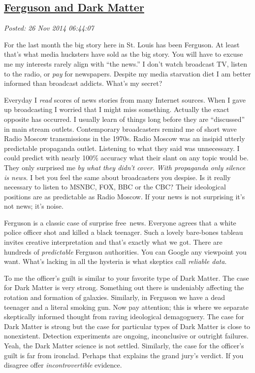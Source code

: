 %

\subsection*{\href{http://bakerjd99.wordpress.com/2014/11/26/ferguson-and-dark-matter/}{Ferguson and Dark Matter}}


\noindent\emph{Posted: 26 Nov 2014 06:44:07}
\vspace{6pt}

For the last month the big story here in St. Louis has been Ferguson. At
least that's what media hucksters have sold as the big story. You will
have to excuse me my interests rarely align with ``the news.'' I don't
watch broadcast TV, listen to the radio, or \emph{pay} for newspapers.
Despite my media starvation diet I am better informed than 
broadcast addicts. What's my secret?

Everyday I \emph{read} scores of news stories from many Internet
sources. When I gave up broadcasting I worried that I
might miss something. Actually the exact opposite has occurred. I
usually learn of things long before they are ``discussed'' in main
stream outlets. Contemporary broadcasters remind me of short wave Radio
Moscow transmissions in the 1970s. Radio Moscow was an insipid utterly
predictable propaganda outlet. Listening to what they said was
unnecessary. I could predict with nearly 100\% accuracy what their slant
on any topic would be. They only surprised me \emph{by what they didn't
cover.} \emph{With propaganda only silence is news.} I bet you feel the
same about broadcasters you despise. Is it really necessary to
listen to MSNBC, FOX, BBC or the CBC? Their ideological positions are
as predictable as Radio Moscow. If your news is not
surprising it's not news; it's noise.

Ferguson is a classic case of surprise free~news. Everyone agrees that a
white police officer shot and killed a black teenager. Such a lovely
bare-bones tableau invites creative interpretation and that's exactly
what we got. There are hundreds of \emph{predictable} Ferguson
authorities. You can Google any viewpoint you want. What's lacking in
all the hysteria is what skeptics call \emph{reliable data}.

To me the officer's guilt is similar to your favorite type of Dark
Matter. The case for Dark Matter is very strong. Something out there is
undeniably affecting the rotation and formation of galaxies. Similarly, in Ferguson
we have a dead teenager and a literal smoking gun. Now pay
attention; this is where we separate skeptically informed thought from
raving ideological demagoguery. The case for Dark Matter is strong but
the case for particular types of Dark Matter is close to nonexistent.
Detection experiments are ongoing, inconclusive or outright failures.
Yeah, the Dark Matter science is not settled. Similarly, the case for
the officer's guilt is far from ironclad. Perhaps that explains the
grand jury's verdict. If you disagree offer \emph{incontrovertible}
evidence.

